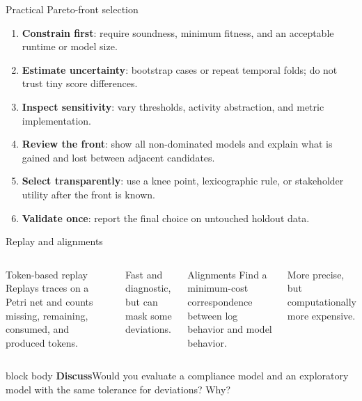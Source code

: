 \documentclass[aspectratio=169,11pt]{beamer}
\newcommand{\promptbox}[1]{%
  \begin{beamercolorbox}[rounded=true,sep=0.65em]{block body}
    \textbf{\color{Coral}Discuss}\quad #1
  \end{beamercolorbox}
}
\begin{document}
\begin{frame}{Practical Pareto-front selection}
  \begin{enumerate}
    \item \textbf{Constrain first}: require soundness, minimum fitness, and an
      acceptable runtime or model size.
    \item \textbf{Estimate uncertainty}: bootstrap cases or repeat temporal
      folds; do not trust tiny score differences.
    \item \textbf{Inspect sensitivity}: vary thresholds, activity abstraction,
      and metric implementation.
    \item \textbf{Review the front}: show all non-dominated models and explain
      what is gained and lost between adjacent candidates.
    \item \textbf{Select transparently}: use a knee point, lexicographic rule,
      or stakeholder utility after the front is known.
    \item \textbf{Validate once}: report the final choice on untouched holdout
      data.
  \end{enumerate}
\end{frame}

\begin{frame}{Replay and alignments}
  \begin{columns}[T,onlytextwidth]
      \begin{block}{Token-based replay}
        Replays traces on a Petri net and counts missing, remaining, consumed,
        and produced tokens.
      \end{block}
      Fast and diagnostic, but can mask some deviations.
      \begin{block}{Alignments}
        Find a minimum-cost correspondence between log behavior and model
        behavior.
      \end{block}
      More precise, but computationally more expensive.
  \end{columns}
  \vspace{0.55cm}
  \promptbox{Would you evaluate a compliance model and an exploratory model with
  the same tolerance for deviations? Why?}
\end{frame}
\end{document}
